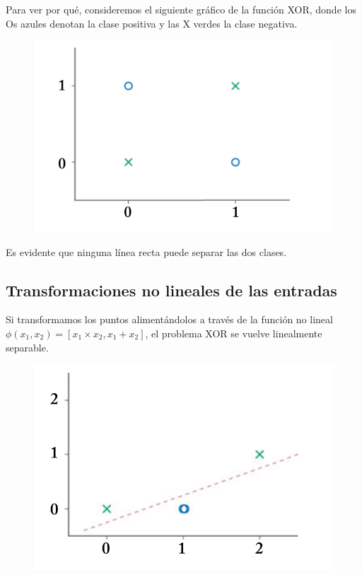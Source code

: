 Para ver por qué, consideremos el siguiente gráfico de la función XOR, donde los Os azules denotan la clase positiva y las X verdes la clase negativa.

\begin{figure}[htb]
	\centering
	 \includegraphics[scale=0.35]{pics/xor.png}
\end{figure}

Es evidente que ninguna línea recta puede separar las dos clases.


\subsection{Transformaciones no lineales de las entradas}
Si transformamos los puntos alimentándolos a través de la función no lineal $\phi(x_1,x_2) = [x_1 \times x_2, x_1 + x_2]$, el problema XOR se vuelve linealmente separable.

\begin{figure}[htb]
	\centering
	 \includegraphics[scale=0.25]{pics/xor2.png}
\end{figure}

